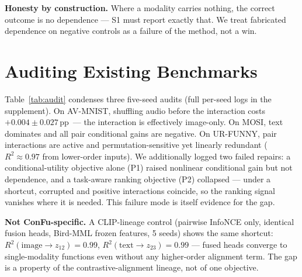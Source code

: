 \documentclass[10pt,twocolumn,letterpaper]{article}
\newcommand{\pp}{\,pp}
\begin{document}
\textbf{Honesty by construction.} Where a modality carries nothing, the correct outcome is no
dependence --- S1 must report exactly that. We treat fabricated dependence on negative controls
as a failure of the method, not a win.

\section{Auditing Existing Benchmarks}\label{sec:audit}
\begin{table}[t]\centering\small
\caption{Five-seed audits of higher-order interactions. Surface metrics pass everywhere;
dependence/utility gates fail everywhere.}
\label{tab:audit}
\end{table}

Table~\ref{tab:audit} condenses three five-seed audits (full per-seed logs in the supplement).
On AV-MNIST, shuffling audio before the interaction costs $+0.004{\pm}0.027$\pp\ --- the
interaction is effectively image-only. On MOSI, text dominates and all pair conditional gains are
negative. On UR-FUNNY, pair interactions are active and permutation-sensitive yet linearly
redundant ($R^2\approx0.97$ from lower-order inputs). We additionally logged two failed repairs:
a conditional-utility objective alone (P1) raised nonlinear conditional gain but not dependence,
and a task-aware ranking objective (P2) collapsed --- under a shortcut, corrupted and positive
interactions coincide, so the ranking signal vanishes where it is needed. This failure mode is
itself evidence for the gap.

\textbf{Not ConFu-specific.} A CLIP-lineage control (pairwise InfoNCE only, identical fusion
heads, Bird-MML frozen features, 5 seeds) shows the same shortcut: $R^2(\mathrm{image}\to
z_{12})=0.99$, $R^2(\mathrm{text}\to z_{23})=0.99$ --- fused heads converge to single-modality
functions even without any higher-order alignment term. The gap is a property of the
contrastive-alignment lineage, not of one objective.
\end{document}
